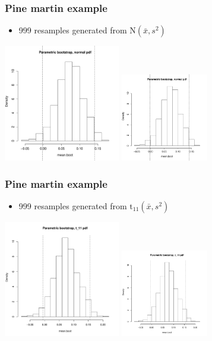 \documentclass[a4paper,12pt]{article}
\newcommand{\bc}{\begin{center}}
\newcommand{\ec}{\end{center}}
\newcommand{\bi}{\begin{itemize}}
\newcommand{\ei}{\end{itemize}}
\begin{document}
\begin{frame}
    \frametitle{Pine martin example}
    \bi
        \item 999 resamples generated from $\mbox{N}(\bar{x},s^2)$
    \ei
\bc
          {\includegraphics[height=2in]{HistMeanBootCINormal}}
          {\includegraphics[height=1.5in]{HistMeanBootCINormal}}
    \ec
\end{frame}

\begin{frame}
    \frametitle{Pine martin example}
    \bi
        \item 999 resamples generated from $\mbox{t}_{11}(\bar{x},s^2)$
    \ei
\bc
         {\includegraphics[height=2in]{HistMeanBootCIt}}
        {\includegraphics[height=1.5in]{HistMeanBootCIt}}
    \ec
\end{frame}
\end{document}
